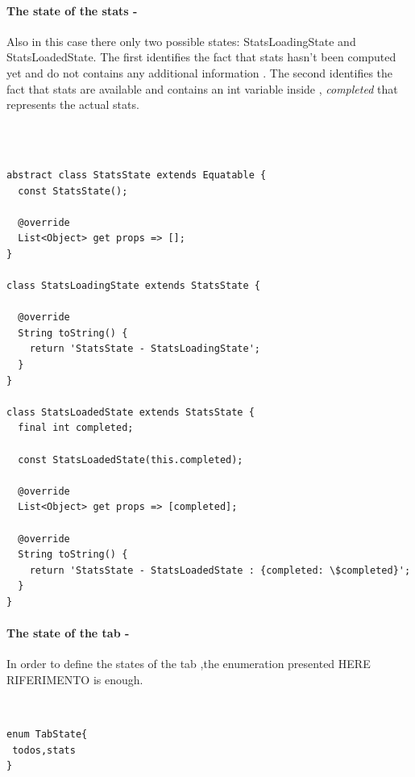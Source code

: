 \paragraph{The state of the stats - }
\label{subpar:todo_app_bloc_core_state}
Also in this case there only two possible states:  StatsLoadingState and StatsLoadedState. The first identifies the fact that stats hasn’t been computed yet and do not contains any additional information . The second identifies the fact that stats are available and contains an int variable inside ,  \textit{completed} that represents the actual stats.
\begin{code}
\mbox{}\\
 \mbox{}
\label{code:2.14}
\begin{verbatim}

abstract class StatsState extends Equatable {
  const StatsState();

  @override
  List<Object> get props => [];
}

class StatsLoadingState extends StatsState {

  @override
  String toString() {
    return 'StatsState - StatsLoadingState';
  }
}

class StatsLoadedState extends StatsState {
  final int completed;

  const StatsLoadedState(this.completed);

  @override
  List<Object> get props => [completed];

  @override
  String toString() {
    return 'StatsState - StatsLoadedState : {completed: \$completed}';
  }
}
\end{verbatim}
\mbox{}
\end{code}

\paragraph{The state of the tab - }
\label{subpar:todo_app_bloc_core_state}
In order to define the states of the tab ,the enumeration presented HERE RIFERIMENTO is enough.
\begin{code}
\mbox{}\\
 \mbox{}
\label{code:2.14}
\begin{verbatim}
enum TabState{
 todos,stats
}
\end{verbatim}
\mbox{}
\end{code}


